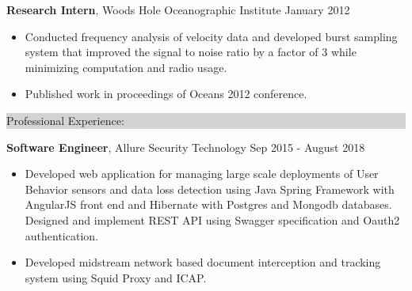 \documentclass{article} %
\newcommand{\rsection}[1]{
  \hspace{-0.4cm}\vspace{0.1cm}
\colorbox{lightgrey}{
\begin{minipage}{1.07\linewidth}
\vspace{0.22cm}
\fontsize{14pt}{16pt}\selectfont #1
\vspace{0.12cm}
\end{minipage}
}
\vspace*{-0.1cm}
}
\newcommand{\rjob}[2]{
  \hspace*{-0.3cm}
{\fontsize{10pt}{12pt}\selectfont #1} \hfill #2
\vspace*{0.1cm}
\hspace*{-1.2cm}
}
\newenvironment{ritemize}{
\hspace*{-0.8cm}
\begin{minipage}{1.05\linewidth}
\begin{itemize}
}{
\end{itemize}
\end{minipage}
}
\newcommand{\ritem}{
\item[-]
}
\begin{document}

\pagebreak{}

\rjob{\textbf{Research Intern}, Woods Hole Oceanographic Institute}{January 2012}\\
\begin{ritemize}
\ritem Conducted frequency analysis of velocity data and developed burst sampling system that improved the signal to noise ratio by a factor of 3 while minimizing computation and radio usage.
\ritem Published work in proceedings of Oceans 2012 conference.
\end{ritemize}

\rsection{Professional Experience:}

\rjob{\textbf{Software Engineer}, Allure Security Technology}{Sep 2015 - August 2018}\\
\begin{ritemize}
\ritem Developed web application for managing large scale deployments of User Behavior sensors and data loss detection using Java Spring Framework with AngularJS front end and Hibernate with Postgres and Mongodb databases. Designed and implement REST API using Swagger specification and Oauth2 authentication.
\ritem Developed midstream network based document interception and tracking system using Squid Proxy and ICAP.
\end{ritemize}
\end{document}
